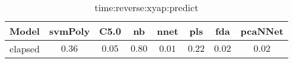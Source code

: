 \begin{table}[!ht]
	\centering
	\begin{tabular}{|c|c|c|c|c|c|c|c|}
		\hline
		Model & svmPoly & C5.0 & nb & nnet & pls & fda & pcaNNet \\ \hline
		elapsed & $0.36$ & $0.05$ & $0.80$ & $0.01$ & $0.22$ & $0.02$ & $0.02$ \\ \hline
	\end{tabular}
	\caption{time:reverse:xyap:predict}
	\label{tab:time:reverse:xyap:predict}
\end{table}
